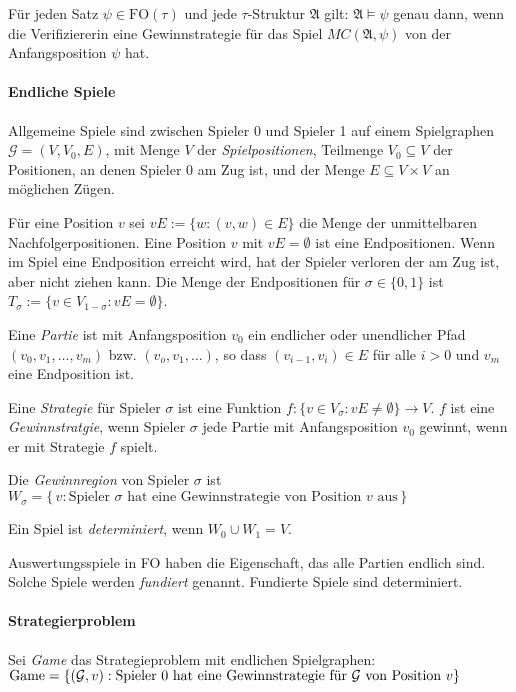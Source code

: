 \documentclass[a4paper,parskip=half*,DIV=15,fontsize=11pt]{scrartcl}
\newcommand{\A}{\mathfrak{A}}
\newcommand{\FO}{\mathrm{FO}}
\begin{document}
Für jeden Satz $\psi \in \FO(\tau)$ und jede $\tau$-Struktur $\A$ gilt: $\A \models \psi$ genau dann, wenn die Verifiziererin eine Gewinnstrategie für das Spiel $MC(\A,\psi)$ von der Anfangsposition $\psi$ hat.

\paragraph{Endliche Spiele} Allgemeine Spiele sind zwischen Spieler 0 und Spieler 1 auf einem Spielgraphen $\mathcal{G}=(V,V_0,E)$, mit Menge $V$ der \emph{Spielpositionen}, Teilmenge $V_0 \subseteq V$ der Positionen, an denen Spieler 0 am Zug ist, und der Menge $E \subseteq V \times V$ an möglichen Zügen.

Für eine Position $v$ sei $vE:=\{w:(v,w)\in E\}$ die Menge der unmittelbaren Nachfolgerpositionen. Eine Position $v$ mit $vE=\emptyset$ ist eine Endpositionen. Wenn im Spiel eine Endposition erreicht wird, hat der Spieler verloren der am Zug ist, aber nicht ziehen kann. Die Menge der Endpositionen für $\sigma \in \{0,1\}$ ist $T_{\sigma}:=\{v \in V_{1-\sigma}:vE=\emptyset\}$.

Eine \emph{Partie} ist mit Anfangsposition $v_0$ ein endlicher oder unendlicher Pfad $(v_0,v_1,\ldots,v_m)$ bzw. $(v_o,v_1,\ldots)$, so dass $(v_{i-1},v_i) \in E$ für alle $i>0$ und $v_m$ eine Endposition ist.

Eine \emph{Strategie} für Spieler $\sigma$ ist eine Funktion $f:\{v \in V_{\sigma}:vE \ne \emptyset \}\rightarrow V$. $f$ ist eine \emph{Gewinnstratgie}, wenn Spieler $\sigma$ jede Partie mit Anfangsposition $v_0$ gewinnt, wenn er mit Strategie $f$ spielt.

Die \emph{Gewinnregion} von Spieler $\sigma$ ist $W_{\sigma}=\{\,v:\text{Spieler $\sigma$ hat eine Gewinnstrategie von Position $v$ aus}\,\}$

Ein Spiel ist \emph{determiniert}, wenn $W_0 \cup W_1=V$.

Auswertungsspiele in FO haben die Eigenschaft, das alle Partien endlich sind. Solche Spiele werden \emph{fundiert} genannt. Fundierte Spiele sind determiniert.

\paragraph{Strategierproblem}
Sei \emph{Game} das Strategieproblem mit endlichen Spielgraphen:
$\mathrm{Game}=\{(\mathcal{G},v):\textnormal{Spieler }0\textnormal{ hat eine Gewinnstrategie für }\mathcal{G}\textnormal{ von Position }v\}$
\end{document}
